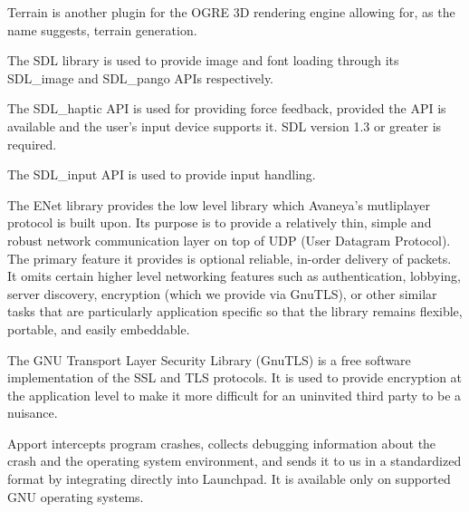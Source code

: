 
Terrain is another plugin for the OGRE 3D rendering engine allowing for, as the name suggests, terrain generation.


The SDL library is used to provide image and font loading through its SDL_image and SDL_pango APIs respectively.
\stopitemize


\startitemize[3]
\setupwhitespace[big]

The SDL_haptic API is used for providing force feedback, provided the API is available and the user's input device supports it. SDL version 1.3 or greater is required.


The SDL_input API is used to provide input handling.
\stopitemize


\startitemize[3]
\setupwhitespace[big]

The ENet library provides the low level library which Avaneya's mutliplayer protocol is built upon. Its purpose is to provide a relatively thin, simple and robust network communication layer on top of UDP (User Datagram Protocol). The primary feature it provides is optional reliable, in-order delivery of packets. It omits certain higher level networking features such as authentication, lobbying, server discovery, encryption (which we provide via GnuTLS), or other similar tasks that are particularly application specific so that the library remains flexible, portable, and easily embeddable.


The GNU Transport Layer Security Library (GnuTLS) is a free software implementation of the SSL and TLS protocols. It is used to provide encryption at the application level to make it more difficult for an uninvited third party to be a nuisance.
\stopitemize


\startitemize[3]
\setupwhitespace[big]

Apport intercepts program crashes, collects debugging information about the crash and the operating system environment, and sends it to us in a standardized format by integrating directly into Launchpad. It is available only on supported GNU operating systems.

